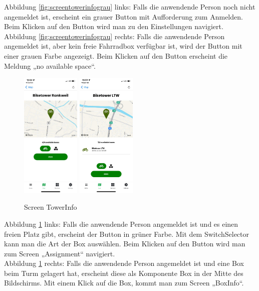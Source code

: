 Abbildung \ref{fig:screentowerinfograu} links: Falls die anwendende Person noch nicht angemeldet ist, erscheint ein grauer Button mit Aufforderung zum Anmelden. Beim Klicken auf den Button wird man zu den Einstellungen navigiert.\\
Abbildung \ref{fig:screentowerinfograu} rechts: Falls die anwendende Person angemeldet ist, aber kein freie Fahrradbox verfügbar ist, wird der Button mit einer grauen Farbe angezeigt. Beim Klicken auf den Button erscheint die Meldung „no available space“.\\
\begin{figure}[H]
  \centering
  \includegraphics[width=0.25\textwidth]{images/app-screenshots/screentowerinfoc.png}
  \includegraphics[width=0.25\textwidth]{images/app-screenshots/screentowerinfod.png}
  \caption{Screen TowerInfo}
  \label{fig:screentowerinfo}
\end{figure}
Abbildung \ref{fig:screentowerinfo} links: Falls die anwendende Person angemeldet ist und es einen freien Platz gibt, erscheint der Button in grüner Farbe. Mit dem SwitchSelector kann man die Art der Box auswählen. Beim Klicken auf den Button wird man zum Screen „Assignment“ navigiert.\\
Abbildung \ref{fig:screentowerinfo} rechts: Falls die anwendende Person angemeldet ist und eine Box beim Turm gelagert hat, erscheint diese als Komponente Box in der Mitte des Bildschirms. Mit einem Klick auf die Box, kommt man zum Screen „BoxInfo“.
